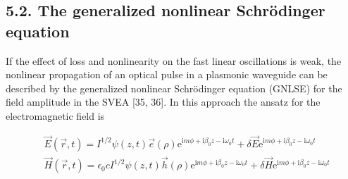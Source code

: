 \documentclass[10pt]{article}
\begin{document}
\subsection*{5.2. The generalized nonlinear Schrödinger equation}
If the effect of loss and nonlinearity on the fast linear oscillations is weak, the nonlinear propagation of an optical pulse in a plasmonic waveguide can be described by the generalized nonlinear Schrödinger equation (GNLSE) for the field amplitude in the SVEA [35, 36]. In this approach the ansatz for the electromagnetic field is


\begin{align*}
& \vec{E}(\vec{r}, t)=I^{1 / 2} \psi(z, t) \vec{e}(\rho) \mathrm{e}^{\mathrm{i} m \phi+\mathrm{i} \beta_{0} z-\mathrm{i} \omega_{0} t}+\delta \vec{E} \mathrm{e}^{\mathrm{i} m \phi+\mathrm{i} \beta_{0} z-\mathrm{i} \omega_{0} t}  \tag{15}\\
& \vec{H}(\vec{r}, t)=\epsilon_{0} c I^{1 / 2} \psi(z, t) \vec{h}(\rho) \mathrm{e}^{\mathrm{i} m \phi+\mathrm{i} \beta_{0} z-\mathrm{i} \omega_{0} t}+\delta \vec{H} \mathrm{e}^{\mathrm{i} m \phi+\mathrm{i} \beta_{0} z-\mathrm{i} \omega_{0} t} \tag{16}
\end{align*}
\end{document}
